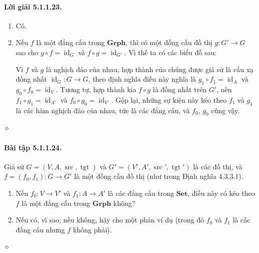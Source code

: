 \paragraph{Lời giải 5.1.1.23.}
\begin{enumerate}[label=\alph*.]
\item Có.
\item Nếu $f$ là một đẳng cấu trong $\mathbf{Grph}$, thì có một đồng cấu đồ thị $g:G'\to G$ sao cho $g\circ f=\operatorname{id}_G$ và $f\circ g=\operatorname{id}_{G'}$. Vì thế ta có các biểu đồ sau:
\begin{center}
\qquad
{}
\end{center}
Vì $f$ và $g$ là nghịch đảo của nhau, hợp thành của chúng được giả sử là cấu xạ đồng nhất $\operatorname{id}_G:G\to G$, theo định nghĩa điều này nghĩa là $g_1\circ f_1=\operatorname{id}_A$ và $g_0\circ f_0=\operatorname{id}_V$. Tương tự, hợp thành kia $f\circ g$ là đồng nhất trên $G'$, nên $f_1\circ g_1=\operatorname{id}_{A'}$ và $f_0\circ g_0=\operatorname{id}_{V'}$. Gộp lại, những sự kiện này kéo theo $f_1$ và $g_1$ là các hàm nghịch đảo của nhau, tức là các đẳng cấu, và $f_0$, $g_0$ cũng vậy.
\end{enumerate}\hfill$\diamond$
\paragraph{Bài tập 5.1.1.24.} Giả sử $G=(V,A,\operatorname{src},\operatorname{tgt})$ và $G'=(V',A',\operatorname{src}',\operatorname{tgt}')$ là các đồ thị, và $f=(f_0,f_1):G\to G'$ là một đồng cấu đồ thị (như trong Định nghĩa 4.3.3.1).
\begin{enumerate}[label=\alph*.]
\item Nếu $f_0:V\to V'$ và $f_1:A\to A'$ là các đẳng cấu trong $\mathbf{Set}$, điều này có kéo theo $f$ là một đẳng cấu trong $\mathbf{Grph}$ không?
\item Nếu có, vì sao; nếu không, hãy cho một phản ví dụ (trong đó $f_0$ và $f_1$ là các đẳng cấu nhưng $f$ không phải).
\end{enumerate}\hfill$\diamond$
